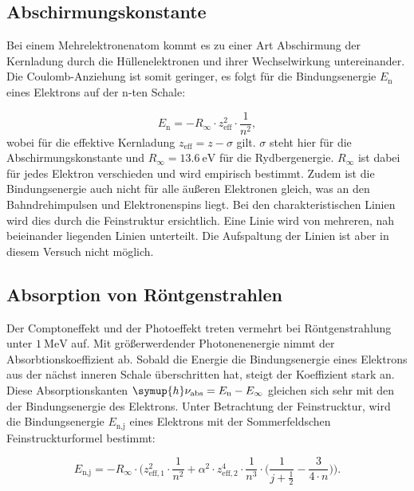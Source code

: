 \subsection{Abschirmungskonstante}
\label{subsec:Abschirmungskonstante}

Bei einem Mehrelektronenatom kommt es zu einer Art Abschirmung der Kernladung durch die Hüllenelektronen und ihrer Wechselwirkung untereinander.
Die Coulomb-Anziehung ist somit geringer, es folgt für die Bindungsenergie $E_\text{n}$ eines Elektrons auf der n-ten Schale:

\begin{equation*}
    E_\text{n} = -R_{\infty} \cdot z^2_\text{eff} \cdot \frac{1}{n^2},
\end{equation*}
wobei für die effektive Kernladung $z_\text{eff} = z - \sigma$ gilt.
$\sigma$ steht hier für die Abschirmungskonstante und $R_{\infty} = \SI{13.6}{\electronvolt}$ für die Rydbergenergie.
$R_{\infty}$ ist dabei für jedes Elektron verschieden und wird empirisch bestimmt.
Zudem ist die Bindungsenergie auch nicht für alle äußeren Elektronen gleich, was an den Bahndrehimpulsen und Elektronenspins liegt.
Bei den charakteristischen Linien wird dies durch die Feinstruktur ersichtlich.
Eine Linie wird von mehreren, nah beieinander liegenden Linien unterteilt.
Die Aufspaltung der Linien ist aber in diesem Versuch nicht möglich.

\subsection{Absorption von Röntgenstrahlen}
\label{Absorption}

Der Comptoneffekt und der Photoeffekt treten vermehrt bei Röntgenstrahlung unter $\SI{1}{\mega\electronvolt}$ auf.
Mit größerwerdender Photonenenergie nimmt der Absorbtionskoeffizient ab.
Sobald die Energie die Bindungsenergie eines Elektrons aus der nächst inneren Schale überschritten hat, steigt der Koeffizient stark an.
Diese Absorptionskanten $\symup{h} \nu_\text{abs} = E_\text{n} - E_\infty$ gleichen sich sehr mit den der Bindungsenergie des Elektrons.
Unter Betrachtung der Feinstrucktur, wird die Bindungsenergie $E_\text{n,j}$ eines Elektrons mit der Sommerfeldschen Feinstruckturformel bestimmt:

\begin{equation}
    \label{eqn:sommerfeld}
    E_\text{n,j} = -R_{\infty} \cdot \Biggl( z^2_{\text{eff},1} \cdot \frac{1}{n^2} + \alpha^2 \cdot z^4_{\text{eff},2} \cdot \frac{1}{n^3} \cdot \Biggl(\frac{1}{j + \frac{1}{2}} - \frac{3}{4 \cdot n} \Biggr)\Biggr).
\end{equation}

